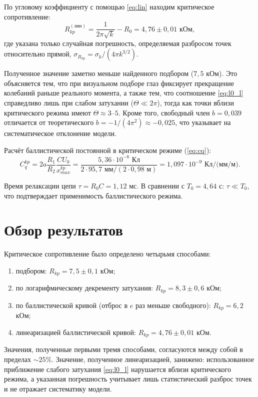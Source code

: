 \documentclass[a4paper,12pt]{article}
\begin{document}
По угловому коэффициенту с помощью \cref{eq:lin} находим критическое сопротивление:
\begin{equation}
    R_{kp}^{(\text{лин})} = \frac{1}{2\pi\sqrt{k}} - R_0 = 4,76 \pm 0,01 \text{ кОм},
\end{equation}
где указана только случайная погрешность, определяемая разбросом точек относительно прямой, $\sigma_{R_{kp}} = \sigma_k / (4\pi k^{3/2})$.

Полученное значение заметно меньше найденного подбором ($7,5$ кОм). Это объясняется тем, что при визуальном подборе глаз фиксирует прекращение колебаний раньше реального момента, а также тем, что соотношение \cref{eq:l0_l} справедливо лишь при слабом затухании ($\Theta \ll 2\pi$), тогда как точки вблизи критического режима имеют $\Theta \approx 3$--$5$. Кроме того, свободный член $b = 0,039$ отличается от теоретического $b = -1/(4\pi^2) \approx -0,025$, что указывает на систематическое отклонение модели.

Расчёт баллистической постоянной в критическом режиме (\cref{eq:cq}):
\begin{equation}
    C_q^{kp} = 2a\frac{R_1}{R_2}\frac{C U_0}{x_{max}^{kp}} = \frac{5,36\cdot10^{-8}\text{ Кл}}{2\cdot 95,7\text{ мм}/(2\cdot 0,98\text{ м})} = 1,097\cdot10^{-9} \text{ Кл/(мм/м)}.
\end{equation}

Время релаксации цепи $\tau = R_0 C = 1,12$ мс.
В сравнении с $T_0 = 4,64$ с: $\tau \ll T_0$, что подтверждает применимость баллистического режима.

\section{Обзор результатов}
Критическое сопротивление было определено четырьмя способами:
\begin{enumerate}
    \item подбором: $R_{kp} = 7,5 \pm 0,1$ кОм;
    \item по логарифмическому декременту затухания: $R_{kp} = 8,3 \pm 0,6$ кОм;
    \item по баллистической кривой (отброс в $e$ раз меньше свободного): $R_{kp} = 6,2$ кОм;
    \item линеаризацией баллистической кривой: $R_{kp} = 4,76 \pm 0,01$ кОм.
\end{enumerate}
Значения, полученные первыми тремя способами, согласуются между собой в пределах $\sim 25\%$. Значение, полученное линеаризацией, занижено: использованное приближение слабого затухания \cref{eq:l0_l} нарушается вблизи критического режима, а указанная погрешность учитывает лишь статистический разброс точек и не отражает систематику модели.
\end{document}
